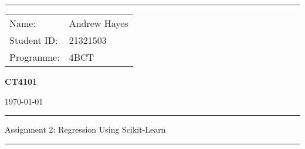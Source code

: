 \documentclass[a4paper, 10pt]{article}
\begin{document}
\hrule \medskip
\begin{minipage}{0.295\textwidth} 
    \vfill
    \raggedright
    \footnotesize 
    \begin{tabular}{@{}l l} %
        Name: & Andrew Hayes \\
        Student ID: & 21321503 \\
        Programme: & 4BCT \\
    \end{tabular}
    \vfill
\end{minipage}
\begin{minipage}{0.4\textwidth} 
    \centering 
    \Large 
    \vfill
    \textbf{CT4101}
    \vfill
\end{minipage}
\begin{minipage}{0.295\textwidth} 
    \raggedleft
    \vfill
    \today
    \vfill
\end{minipage}
\smallskip
\hrule 
\begin{center}
    \normalsize
    Assignment 2: Regression Using Scikit-Learn
\end{center}
\hrule
\nocite{*}
\printbibliography
\end{document}
